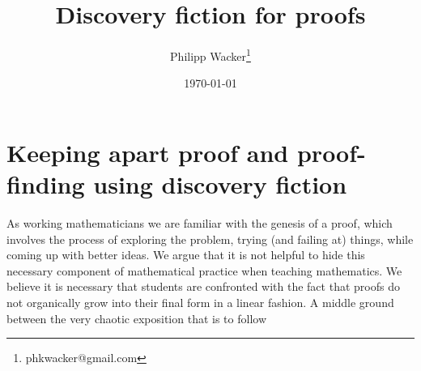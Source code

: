 \documentclass[11pt]{article}
\date \today
\title{Discovery fiction for proofs}
\author{Philipp Wacker\thanks{phkwacker@gmail.com}}
\theoremstyle{plain}
\theoremstyle{definition}
\theoremstyle{remark}
\numberwithin{equation}{section}
\begin{document}
\maketitle
\section{Keeping apart proof and proof-finding using discovery fiction}
    As working mathematicians we are familiar with the genesis of a proof, which involves the process of exploring the problem, trying (and failing at) things, while coming up with better ideas. We argue that it is not helpful to hide this necessary component of mathematical practice when teaching mathematics. We believe it is necessary that students are confronted with the fact that proofs do not organically grow into their final form in a linear fashion. A middle ground between the very chaotic exposition that is to follow 
\end{document}

